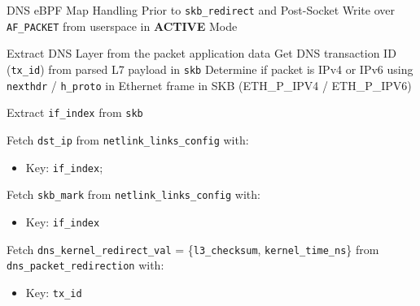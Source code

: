 \documentclass [11pt, proquest] {uwthesis}[2020/02/24]
\begin{document}
\begin{algorithm}[H]
\caption{DNS eBPF Map Handling Prior to \texttt{skb\_redirect} and Post-Socket Write over \texttt{AF\_PACKET} from userspace in \textbf{ACTIVE} Mode}
\label{sec:alg2}

\small %


Extract DNS Layer from the packet application data\;
Get DNS transaction ID (\texttt{tx\_id}) from parsed L7 payload in \texttt{skb}\;
Determine if packet is IPv4 or IPv6 using \texttt{nexthdr} / \texttt{h\_proto} in Ethernet frame in SKB (ETH\_P\_IPV4 / ETH\_P\_IPV6)\;

Extract \texttt{if\_index} from \texttt{skb}\;

Fetch \texttt{dst\_ip} from \texttt{netlink\_links\_config} with:
\begin{itemize}[nosep]
    \item Key: \texttt{if\_index};
\end{itemize}
Fetch \texttt{skb\_mark} from \texttt{netlink\_links\_config} with:
\begin{itemize}[nosep]
    \item Key: \texttt{if\_index}\;
\end{itemize}

Fetch \texttt{dns\_kernel\_redirect\_val} = \{\texttt{l3\_checksum}, \texttt{kernel\_time\_ns}\} from \texttt{dns\_packet\_redirection} with:
\begin{itemize}[nosep]
    \item Key: \texttt{tx\_id}\;
\end{itemize}


\end{algorithm}
\end{document}
